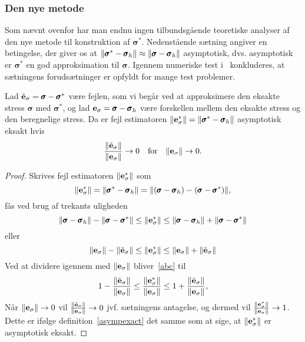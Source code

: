 \subsubsection{Den nye metode}
Som nævnt ovenfor har man endnu ingen tilbundsgående teoretiske
analyser af den nye metode til konstruktion af ${\pmb\sigma}^{\ast}$.
Nedenstående sætning angiver en betingelse, der giver os at
$\|\pmb{\sigma}^{\ast}-\pmb{\sigma}_h\| \approx
\|\pmb{\sigma}-\pmb{\sigma}_h\|$ asymptotisk, dvs. asymptotisk er
$\pmb{\sigma}^{\ast}$ en god approksimation til $\pmb\sigma$. Igennem
numeriske test i~\cite{zz2} konkluderes, at sætningens forudsætninger
er opfyldt for mange test problemer.

\begin{theorem}
Lad $\tilde{\bf e}_\sigma = \pmb{\sigma} - \pmb{\sigma}^{\ast}$ være
fejlen, som vi begår ved at approksimere den eksakte stress
$\pmb\sigma$ med $\pmb{\sigma}^{\ast}$, og lad
${\bf e}_\sigma = \pmb{\sigma} - \pmb{\sigma}_h$ være
forskellen mellem den eksakte stress og den beregnelige stress. Da er
fejl estimatoren $\|{\bf e}_\sigma^{\ast}\|=
\|\pmb{\sigma}^{\ast}-\pmb{\sigma}_h\|$ asymptotisk eksakt hvis
\begin{equation}
  \frac{\|\tilde{{\bf e}}_\sigma\|}{\|{\bf e}_\sigma\|}
  \rightarrow 0 \quad \text{for} \quad \|{\bf e}_\sigma\|
  \rightarrow 0.
\end{equation}
\end{theorem}
\begin{proof}
Skrives fejl estimatoren $\|{\bf e}_\sigma^{\ast}\|$ som
\begin{equation}
  \|{\bf e}_\sigma^{\ast}\| =
  \|\pmb{\sigma}^{\ast}-\pmb{\sigma}_h\| =
  \| ( \pmb{\sigma} - \pmb{\sigma}_h ) -
  ( \pmb{\sigma} - \pmb{\sigma}^{\ast} ) \|,
\end{equation}
fås ved brug af trekants uligheden
\begin{equation}
  \|\pmb{\sigma}-\pmb{\sigma}_h\| -
  \|\pmb{\sigma}-\pmb{\sigma}^{\ast}\|
  \leq \|{\bf e}_\sigma^{\ast}\| \leq
  \|\pmb{\sigma}-\pmb{\sigma}_h\| +
  \|\pmb{\sigma}-\pmb{\sigma}^{\ast}\|
\end{equation}
eller
\begin{equation} \label{abc}
  \|{\bf e}_\sigma\| - \|\tilde{{\bf e}}_\sigma\|
  \leq \|{\bf e}_\sigma^{\ast}\| \leq
  \|{\bf e}_\sigma\| + \|\tilde{{\bf e}}_\sigma\|
\end{equation}
Ved at dividere igennem med $\|{\bf e}_\sigma\|$ bliver~\eqref{abc}
til
\begin{equation}
  1 - \frac{\|\tilde{{\bf e}}_\sigma\|}{\|{\bf e}_\sigma\|}
  \leq \frac{\|{\bf e}_\sigma^{\ast}\|}{\|{\bf e}_\sigma\|} \leq
  1 + \frac{\|\tilde{{\bf e}}_\sigma\|}{\|{\bf e}_\sigma\|},
\end{equation}
Når $\|{\bf e}_\sigma\|\rightarrow 0$ vil
$\frac{\|\tilde{{\bf e}}_\sigma\|}{\|{\bf e}_\sigma\|}\rightarrow 0$
jvf. sætningens antagelse, og dermed vil
$\frac{\|{\bf e}_\sigma^{\ast}\|}{\|{\bf e}_\sigma\|}\rightarrow 1$.
Dette er ifølge definition~\ref{asympexact} det samme som at sige, at
$\|{\bf e}_\sigma^{\ast}\|$ er asymptotisk eksakt.
\end{proof}
